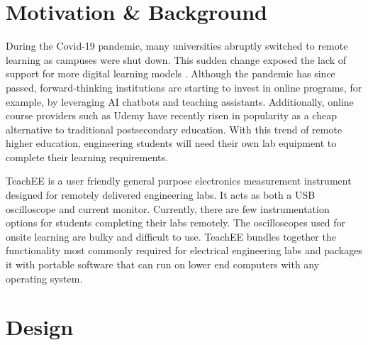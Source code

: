 \documentclass[letterpaper,11pt]{article}
\begin{document}
\section{Motivation \& Background}
During the Covid-19 pandemic, many universities abruptly switched to remote
learning as campuses were shut down. This sudden change exposed the lack of
support for more digital learning models \cite{online_learning}. Although the
pandemic has since passed, forward-thinking institutions are starting to invest
in online programs, for example, by leveraging AI chatbots and teaching assistants.
Additionally, online course providers such as Udemy have recently risen in popularity
as a cheap alternative to traditional postsecondary education. With this trend of
remote higher education, engineering students will need their own lab equipment to
complete their learning requirements.

TeachEE is a user friendly general purpose electronics measurement instrument
designed for remotely delivered engineering labs. It acts as both a
USB oscilloscope and current monitor. Currently, there are few instrumentation
options for students completing their labs remotely. The oscilloscopes used for
onsite learning are bulky and difficult to use. TeachEE bundles
together the functionality most commonly required for electrical engineering
labs and packages it with portable software that can run on lower end computers
with any operating system.

\section{Design}
\end{document}
